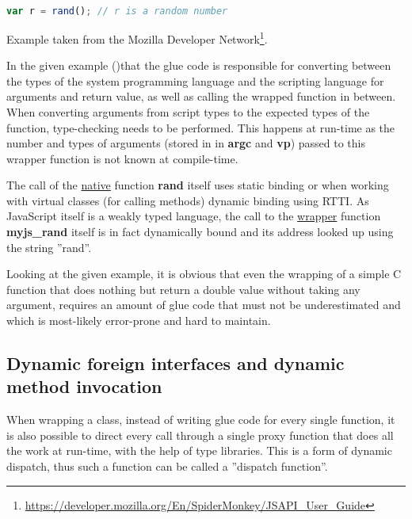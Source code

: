 \SingleSpacing
\begin{lstlisting}[language=JavaScript, caption=Using a C function from SpiderMonkey]
var r = rand();	// r is a random number
\end{lstlisting}
\OnehalfSpacing

Example taken from the Mozilla Developer Network\footnote{\url{https://developer.mozilla.org/En/SpiderMonkey/JSAPI_User_Guide}}.

In the given example ()that the glue code is responsible for converting between the types of the system programming language and the scripting language for arguments and return value, as well as calling the wrapped function in between. When converting arguments from script types to the expected types of the function, type-checking needs to be performed. This happens at run-time as the number and types of arguments (stored in in \textbf{argc} and \textbf{vp}) passed to this wrapper function is not known at compile-time.

The call of the \underline{native} function \textbf{rand} itself uses static binding or when working with virtual classes (for calling methods) dynamic binding using RTTI. As JavaScript itself is a weakly typed language, the call to the \underline{wrapper} function \textbf{myjs\_rand} itself is in fact dynamically bound and its address looked up using the string ''rand''.

Looking at the given example, it is obvious that even the wrapping of a simple C function that does nothing but return a double value without taking any argument, requires an amount of glue code that must not be underestimated and which is most-likely error-prone and hard to maintain.


\subsection{Dynamic foreign interfaces and dynamic method invocation}
\label{sec:DynamicForeignInterfaces}

When wrapping a class, instead of writing glue code for every single function, it is also possible to direct every call through a single proxy function that does all the work at run-time, with the help of type libraries. This is a form of dynamic dispatch, thus such a function can be called a ''dispatch function''.


